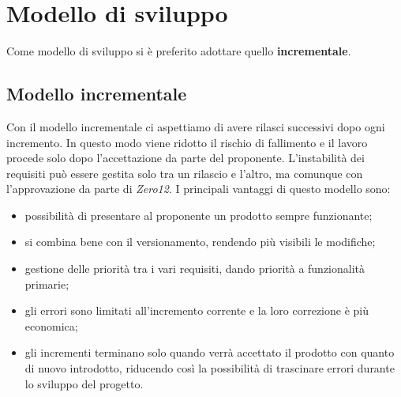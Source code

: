 \section{Modello di sviluppo}
Come modello di sviluppo si è preferito adottare quello \textbf{incrementale}.

\subsection{Modello incrementale}
Con il modello incrementale ci aspettiamo di avere rilasci successivi dopo ogni incremento.  In questo modo viene ridotto il rischio di fallimento e il lavoro procede solo dopo l’accettazione da parte del proponente.
L’instabilità dei requisiti può essere gestita solo tra un rilascio e l’altro, ma comunque con l’approvazione da parte di \textit{Zero12}.
I principali vantaggi di questo modello sono:
\begin{itemize}
\item possibilità di presentare al proponente un prodotto sempre funzionante;
\item si combina bene con il versionamento\glo, rendendo più visibili le modifiche;
\item gestione delle priorità tra i vari requisiti,  dando priorità a funzionalità primarie;
\item gli errori sono limitati all’incremento corrente e la loro correzione è più economica;
\item gli incrementi terminano solo quando verrà accettato il prodotto con quanto di nuovo introdotto,  riducendo così la possibilità di trascinare errori durante lo sviluppo del progetto.

\end{itemize}
